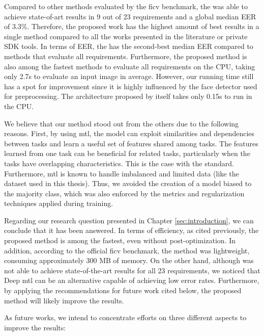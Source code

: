 Compared to other methods evaluated by the \acs{ficv} benchmark, the \methodname was able to achieve state-of-art results in 9 out of 23 requirements and a global median EER of 3.3\%. Therefore, the proposed work has the highest amount of best results in a single method compared to all the works presented in the literature or private SDK tools. In terms of EER, the \methodname has the second-best median EER compared to methods that evaluate all requirements. Furthermore, the proposed method is also among the fastest methods to evaluate all requirements on the CPU, taking only 2.7s to evaluate an input image in average. However, our running time still has a spot for improvement since it is highly influenced by the face detector used for preprocessing. The architecture proposed by itself takes only 0.15s to run in the CPU.

We believe that our method stood out from the others due to the following reasons. First, by using \acs{mtl}, the model can exploit similarities and dependencies between tasks and learn a useful set of features shared among tasks. The features learned from one task can be beneficial for related tasks, particularly when the tasks have overlapping characteristics. This is the case with the \icao standard. Furthermore, \acs{mtl} is known to handle imbalanced and limited data (like the dataset used in this thesis). Thus, we avoided the creation of a model biased to the majority class, which was also enforced by the metrics and regularization techniques applied during training.

Regarding our research question presented in Chapter \ref{sec:introduction}, we can conclude that it has been answered. In terms of efficiency, as cited previously, the proposed method is among the fastest, even without post-optimization. In addition, according to the official \acs{ficv} benchmark, the method was lightweight, consuming approximately 300 MB of memory. On the other hand, although \methodname was not able to achieve state-of-the-art results for all 23 requirements, we noticed that Deep \acl{mtl} can be an alternative capable of achieving low error rates. Furthermore, by applying the recommendations for future work cited below, the proposed method will likely improve the results.

As future works, we intend to concentrate efforts on three different aspects to improve the results:

